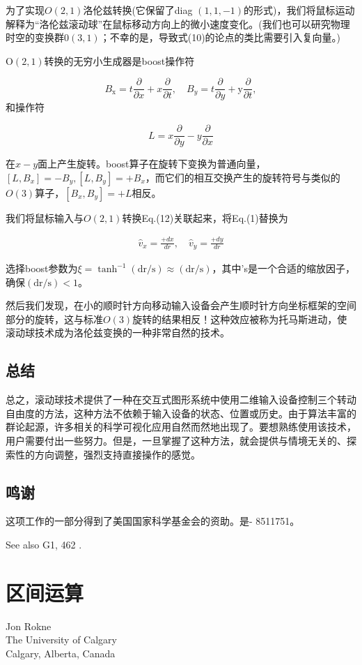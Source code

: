 \begin{CJK}{UTF8}{gbsn}
为了实现$O(2,1)$洛伦兹转换(它保留了diag $(1,1,-1)$的形式)，我们将鼠标运动解释为“洛伦兹滚动球”在鼠标移动方向上的微小速度变化。(我们也可以研究物理时空的变换群$0(3,1)$；不幸的是，导致式(10)的论点的类比需要引入复向量。)


$\mathrm{O}(2,1)$转换的无穷小生成器是boost操作符


$$
B_{\mathrm{x}}=t \frac{\partial}{\partial x}+x \frac{\partial}{\partial t}, \quad B_{y}=t \frac{\partial}{\partial y}+\mathrm{y} \frac{\partial}{\partial t} ,
$$
和操作符

$$
L=x \frac{\partial}{\partial y}-y \frac{\partial}{\partial x}
$$

在$x-y$面上产生旋转。boost算子在旋转下变换为普通向量，$\left[L, B_{x}\right]=-B_{y},\left[L, B_{y}\right]=+B_{x}$，而它们的相互交换产生的旋转符号与类似的$O(3)$算子，$\left[B_{x}, B_{y}\right]=+L$相反。


我们将鼠标输入与$O(2,1)$转换Eq.(12)关联起来，将Eq.(1)替换为

\begin{align}
\hat{v}_x=\frac{+dx}{dr}, \quad \hat{v}_y=\frac{+dy}{dr}
\end{align}

选择boost参数为$\xi=\tanh ^{-1}(\mathrm{dr} / \mathrm{s}) \approx(\mathrm{dr} / \mathrm{s})$，其中's是一个合适的缩放因子，确保$(\mathrm{dr} / \mathrm{s})<1$。


然后我们发现，在小的顺时针方向移动输入设备会产生顺时针方向坐标框架的空间部分的旋转，这与标准$O(3)$旋转的结果相反！这种效应被称为托马斯进动，使滚动球技术成为洛伦兹变换的一种非常自然的技术。


\subsection*{总结}
总之，滚动球技术提供了一种在交互式图形系统中使用二维输入设备控制三个转动自由度的方法，这种方法不依赖于输入设备的状态、位置或历史。由于算法丰富的群论起源，许多相关的科学可视化应用自然而然地出现了。要想熟练使用该技术，用户需要付出一些努力。但是，一旦掌握了这种方法，就会提供与情境无关的、探索性的方向调整，强烈支持直接操作的感觉。

\subsection*{鸣谢}
这项工作的一部分得到了美国国家科学基金会的资助。是- 8511751。

See also G1, 462 .\\

\newpage
\section{区间运算}
\begin{center}
\small{
Jon Rokne\\
The University of Calgary\\
Calgary, Alberta, Canada}
\end{center}



\end{CJK}

